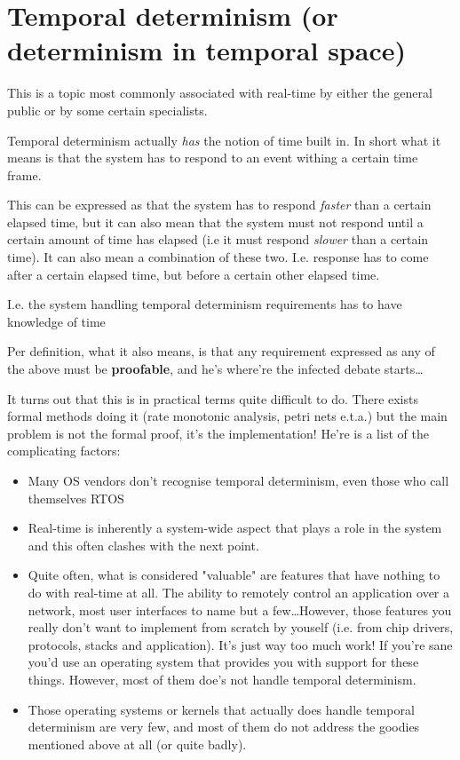 \chapter{Temporal determinism (or determinism in temporal space)}
This is a topic most commonly associated with real-time by either the general public or by some certain specialists.

Temporal determinism actually \textit{has} the notion of time built in. In short what it means is that the system has to respond to an event withing a certain time frame. 

This can be expressed as that the system has to respond \textit{faster} than a certain elapsed time, but it can also mean that the system must not respond until a certain amount of time has elapsed (i.e it must respond \textit{slower} than a certain time). It can also mean a combination of these two. I.e. response has to come after a certain elapsed time, but before a certain other elapsed time.

I.e. the system handling temporal determinism requirements has to have knowledge of time 

Per definition, what it also means, is that any requirement expressed as any of the above must be \textbf{\textit{}proofable}, and he's where're the infected debate starts\ldots

It turns out that this is in practical terms quite difficult to do. There exists formal methods doing it (rate monotonic analysis, petri nets e.t.a.) but the main problem is not the formal proof, it's the implementation! He're is a list of the complicating factors:

\begin{itemize}
\item Many OS vendors don't recognise temporal determinism, even those who call themselves RTOS 
\item Real-time is inherently a system-wide aspect that plays a role in the system and this often clashes with the next point.
\item Quite often, what is considered "valuable" are features that have nothing to do with real-time at all. The ability to remotely control an application over a network, most user interfaces to name but a few\ldots However, those features you really don't want to implement from scratch by youself (i.e. from chip drivers, protocols, stacks and application). It's just way too much work! If you're sane you'd use an operating system that provides you with support for these things. However, most of them doe's not handle temporal determinism.
\item Those operating systems or kernels that actually does handle temporal determinism are very few, and most of them do not address the goodies mentioned above at all (or quite badly).
\end{itemize}

